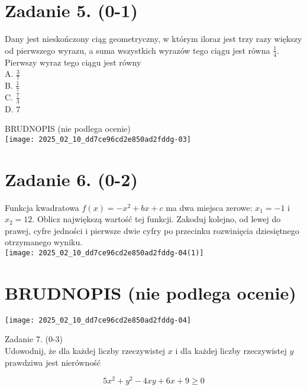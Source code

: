 \documentclass[10pt]{article}
\begin{document}
\section*{Zadanie 5. (0-1)}
Dany jest nieskończony ciąg geometryczny, w którym iloraz jest trzy razy większy od pierwszego wyrazu, a suma wszystkich wyrazów tego ciągu jest równa \(\frac{1}{4}\). Pierwszy wyraz tego ciągu jest równy\\
A. \(\frac{3}{7}\)\\
B. \(\frac{1}{7}\)\\
C. \(\frac{7}{3}\)\\
D. 7

BRUDNOPIS (nie podlega ocenie)\\
\texttt{[image: 2025\_02\_10\_dd7ce96cd2e850ad2fddg-03]}

\section*{Zadanie 6. (0-2)}
Funkcja kwadratowa \(f(x)=-x^{2}+b x+c\) ma dwa miejsca zerowe: \(x_{1}=-1\) i \(x_{2}=12\). Oblicz największą wartość tej funkcji. Zakoduj kolejno, od lewej do prawej, cyfre jedności i pierwsze dwie cyfry po przecinku rozwinięcia dziesiętnego otrzymanego wyniku.\\
\texttt{[image: 2025\_02\_10\_dd7ce96cd2e850ad2fddg-04(1)]}

\section*{BRUDNOPIS (nie podlega ocenie)}
\begin{center}
\texttt{[image: 2025\_02\_10\_dd7ce96cd2e850ad2fddg-04]}
\end{center}

Zadanie 7. (0-3)\\
Udowodnij, że dla każdej liczby rzeczywistej \(x\) i dla każdej liczby rzeczywistej \(y\) prawdziwa jest nierówność

\[
5 x^{2}+y^{2}-4 x y+6 x+9 \geq 0
\]
\end{document}
